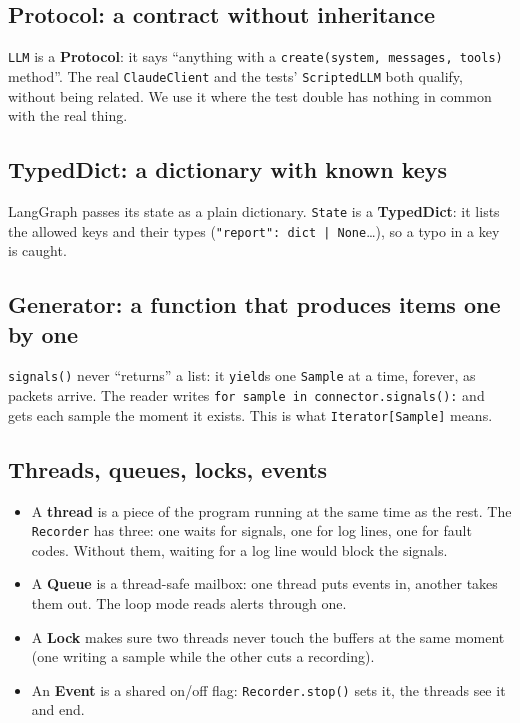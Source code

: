 \documentclass[10pt]{article}
\newcommand{\brkus}{\textunderscore\allowbreak}
\newcommand{\f}[1]{\texttt{\let\_\brkus #1}}
\begin{document}
\subsection{Protocol: a contract without inheritance}
\f{LLM} is a \textbf{Protocol}: it says ``anything with a \f{create(system, messages, tools)}
method''. The real \f{ClaudeClient} and the tests' \f{ScriptedLLM} both qualify, without
being related. We use it where the test double has nothing in common with the real thing.

\subsection{TypedDict: a dictionary with known keys}
LangGraph passes its state as a plain dictionary. \f{State} is a \textbf{TypedDict}: it lists the
allowed keys and their types (\f{"report": dict | None}\ldots), so a typo in a key is caught.

\subsection{Generator: a function that produces items one by one}
\f{signals()} never ``returns'' a list: it \f{yield}s one \f{Sample} at a time, forever, as
packets arrive. The reader writes \f{for sample in connector.signals():} and gets each sample the
moment it exists. This is what \f{Iterator[Sample]} means.

\subsection{Threads, queues, locks, events}
\begin{itemize}
\item A \textbf{thread} is a piece of the program running at the same time as the rest. The
\f{Recorder} has three: one waits for signals, one for log lines, one for fault codes. Without
them, waiting for a log line would block the signals.
\item A \textbf{Queue} is a thread-safe mailbox: one thread puts events in, another takes them
out. The loop mode reads alerts through one.
\item A \textbf{Lock} makes sure two threads never touch the buffers at the same moment (one
writing a sample while the other cuts a recording).
\item An \textbf{Event} is a shared on/off flag: \f{Recorder.stop()} sets it, the threads see it
and end.
\end{itemize}
\end{document}
